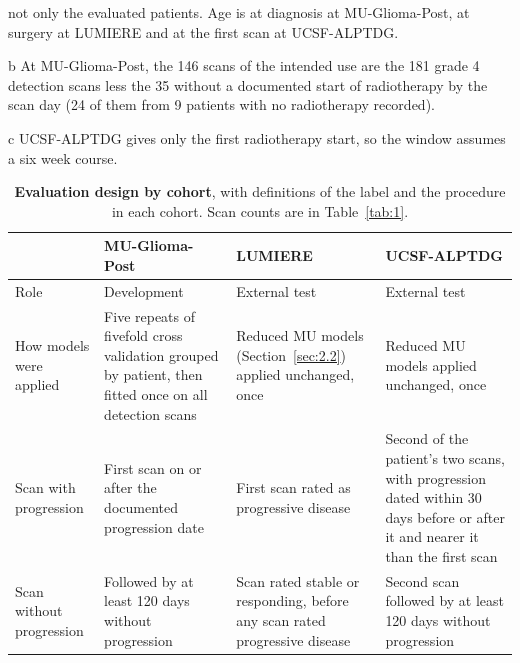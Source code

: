 \documentclass[largeformat]{interact} %
\begin{document}
\begin{table}[!htbp]
\begin{threeparttable}
\begin{tablenotes}
not only the evaluated patients. Age is at diagnosis at MU-Glioma-Post, at surgery at LUMIERE and at the first scan at
UCSF-ALPTDG.
\item[b] At MU-Glioma-Post, the 146 scans of the intended use are the 181 grade 4 detection scans less the 35 without a
documented start of radiotherapy by the scan day (24 of them from 9 patients with no radiotherapy recorded).
\item[c] UCSF-ALPTDG gives only the first radiotherapy start, so the window assumes a six week course.
\end{tablenotes}
\end{threeparttable}
\end{table}

\begin{table}[!htbp]
\centering
\caption[Evaluation design]{\textbf{Evaluation design by cohort}, with definitions of the label and the
procedure in each cohort. Scan counts are in Table~\ref{tab:1}.}
\label{tab:eval}
\footnotesize
\zebrarows
\begin{tabularx}{\linewidth}{@{}R{2.6cm}LLL@{}}
\toprule
 & MU-Glioma-Post & LUMIERE & UCSF-ALPTDG \\
\midrule
Role & Development & External test & External test \\
How models were applied & Five repeats of fivefold cross validation grouped by patient, then fitted once on all detection scans & Reduced MU models (Section~\ref{sec:2.2}) applied unchanged, once & Reduced MU models applied unchanged, once \\
Scan with progression & First scan on or after the documented progression date & First scan rated as progressive disease & Second of the patient's two scans, with progression dated within 30 days before or after it and nearer it than the first scan \\
Scan without progression & Followed by at least 120 days without progression & Scan rated stable or responding, before any scan rated progressive disease & Second scan followed by at least 120 days without progression \\
\bottomrule
\end{tabularx}
\end{table}
\end{document}
